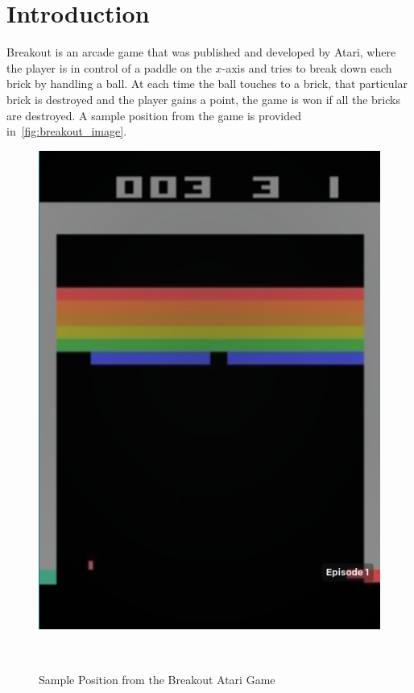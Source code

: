 \section{Introduction}
Breakout is an arcade game that was published and developed by Atari, where the player is in control of a paddle on the \(x\)-axis and tries to break down each brick by handling a ball. At each time the ball touches to a brick, that particular brick is destroyed and the player gains a point, the game is won if all the bricks are destroyed. A sample position from the game is provided in~\autoref{fig:breakout_image}.

\begin{figure}[h]
    \centering{}
    \includegraphics[width=\linewidth, height=0.33\textheight, keepaspectratio]{img/breakout.png}
    \caption{Sample Position from the Breakout Atari Game~\autocite{breakout_image}}~\label{fig:breakout_image}
\end{figure}

